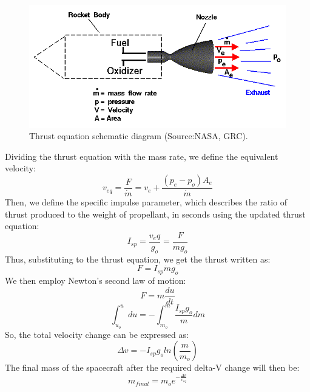 \begin{figure}[h!]
\centering
\includegraphics[scale=0.6]{figures/Orbiter/rockth.png}
\caption{Thrust equation schematic diagram (Source:NASA, GRC).\cite{rocketeq}}
\label{fig:rocketim}
\end{figure}

Dividing the thrust equation with the mass rate, we define the equivalent velocity:
\begin{equation}
v_{eq}=\frac{F}{\dot{m}}=v_e+\frac{(p_e-p_o) A_e}{\dot{m}}
\end{equation}
Then, we define the specific impulse parameter, which describes the ratio of thrust produced to the weight of propellant, in seconds using the updated thrust equation:
\begin{equation}
I_{sp}=\frac{v_eq}{g_o} =\frac{F}{\dot{m}g_o}
\end{equation}
Thus, substituting to the thrust equation, we get the thrust written as:
\begin{equation}
F=I_{sp}\dot{m}g_o
\end{equation}
We then employ Newton’s second law of motion:
\begin{equation}
F=m\frac{du}{dt}
\end{equation}
\begin{equation}
\int_{u_o}^{u}du=-\int_{m_o}^{m}\frac{I_{sp}g_o}{m}dm
\end{equation}
So, the total velocity change can be expressed as:
\begin{equation}
\Delta v=-I_{sp}g_o ln(\frac{m}{m_o})
\end{equation}
The final mass of the spacecraft after the required delta-V change will then be:
\begin{equation}
m_{final}=m_{o}e^{-\frac{\Delta v}{v_{eq}}}
\end{equation}

